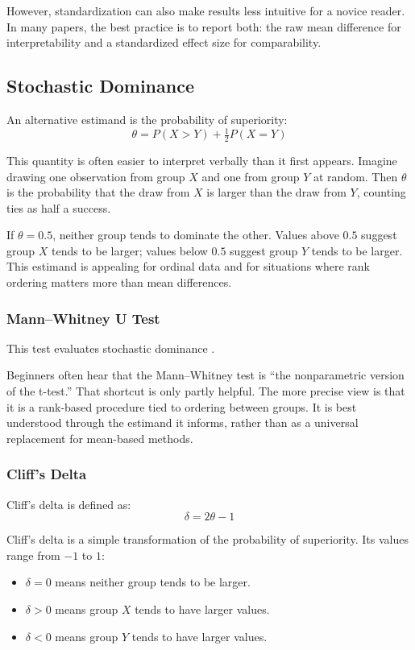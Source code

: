 \documentclass[11pt]{article}
\begin{document}
However, standardization can also make results less intuitive for a novice reader. In many papers, the best practice is to report both: the raw mean difference for interpretability and a standardized effect size for comparability.

\subsection{Stochastic Dominance}

An alternative estimand is the probability of superiority:
\begin{equation}
\theta = P(X > Y) + \tfrac{1}{2} P(X = Y)
\end{equation}

This quantity is often easier to interpret verbally than it first appears. Imagine drawing one observation from group $X$ and one from group $Y$ at random. Then $\theta$ is the probability that the draw from $X$ is larger than the draw from $Y$, counting ties as half a success.

If $\theta = 0.5$, neither group tends to dominate the other. Values above $0.5$ suggest group $X$ tends to be larger; values below $0.5$ suggest group $Y$ tends to be larger. This estimand is appealing for ordinal data and for situations where rank ordering matters more than mean differences.

\subsubsection{Mann--Whitney U Test}

This test evaluates stochastic dominance \citep{mann1947test}.

Beginners often hear that the Mann--Whitney test is ``the nonparametric version of the t-test.'' That shortcut is only partly helpful. The more precise view is that it is a rank-based procedure tied to ordering between groups. It is best understood through the estimand it informs, rather than as a universal replacement for mean-based methods.

\subsubsection{Cliff's Delta}

Cliff's delta is defined as:
\begin{equation}
\delta = 2\theta - 1
\end{equation}

Cliff's delta is a simple transformation of the probability of superiority. Its values range from $-1$ to $1$:
\begin{itemize}
\item $\delta = 0$ means neither group tends to be larger.
\item $\delta > 0$ means group $X$ tends to have larger values.
\item $\delta < 0$ means group $Y$ tends to have larger values.
\end{itemize}
\end{document}
